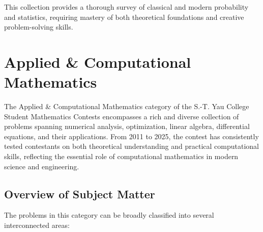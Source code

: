 This collection provides a thorough survey of classical and modern probability and statistics, requiring mastery of both theoretical foundations and creative problem-solving skills.

\section{Applied \& Computational Mathematics}
\label{sec:applied}

The Applied \& Computational Mathematics category of the S.-T. Yau College Student Mathematics Contests encompasses a rich and diverse collection of problems spanning numerical analysis, optimization, linear algebra, differential equations, and their applications. From 2011 to 2025, the contest has consistently tested contestants on both theoretical understanding and practical computational skills, reflecting the essential role of computational mathematics in modern science and engineering.

\subsection{Overview of Subject Matter}

The problems in this category can be broadly classified into several interconnected areas:


